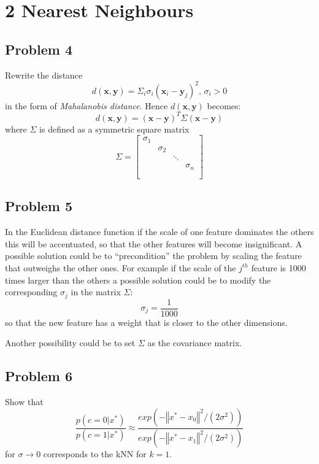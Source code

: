 \section*{2 Nearest Neighbours}

\subsection*{Problem 4}
Rewrite the distance
\[
    d(\mathbf{x}, \mathbf{y}) = 
    \Sigma_i \sigma_i (\mathbf{x}_i - \mathbf{y}_j)^2, \, \sigma_i > 0
\]
in the form of \textit{Mahalanobis distance}. Hence $d(\mathbf{x}, \mathbf{y})$
becomes:
\[
    d(\mathbf{x}, \mathbf{y}) = 
    (\mathbf{x} - \mathbf{y})^T \Sigma (\mathbf{x} - \mathbf{y}) 
\]
where $\Sigma$ is defined as a symmetric square matrix
\[
\Sigma =
\left[
    \begin{array}{ccccc}
        \sigma_1\\
        & \sigma_2\\
        &  & \ddots\\
        &  &  & \sigma_n\\
        \\
    \end{array}
\right]
\]

\subsection*{Problem 5} 
In the Euclidean distance function if the scale of one feature dominates the
others this will be accentuated, so that the other features will become
insignificant.
A possible solution could be to ``precondition'' the problem by scaling the feature
that outweighs the other ones. For example if the scale of the $j^{th}$ feature is
1000 times larger than the others a possible solution could be to modify the
corresponding $\sigma_j$ in the matrix $\Sigma$:
\[
    \sigma_j = \frac{1}{1000}
\]
so that the new feature has a weight that is closer to the other dimensions.

Another possibility could be to set $\Sigma$ as the covariance matrix.


\subsection*{Problem 6} 
Show that 
\[
    \frac{p(c=0 | x^*)}{p(c=1 | x^*)} \approx 
    \frac{exp(-\left\Vert x^* - x_0 \right\Vert^2/(2\sigma^2))}
         {exp(-\left\Vert x^* - x_1 \right\Vert^2/(2\sigma^2))}
\]
for $\sigma \rightarrow 0 $ corresponds to the kNN for $k = 1$.

